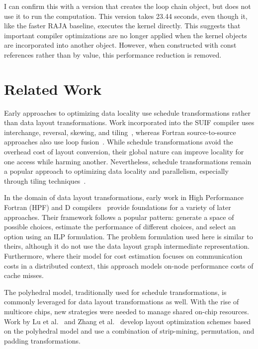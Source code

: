 I can confirm this with a version that creates the loop chain object, but does not use it to run the computation.
This version takes 23.44 seconds, even though it, like the faster RAJA baseline, executes the kernel directly.
This suggests that important compiler optimizations are no longer applied when the kernel objects are incorporated into another object. 
However, when constructed with const references rather than by value, this performance reduction is removed.

\section{Related Work}

Early approaches to optimizing data locality use schedule transformations rather than data layout transformations. 
Work incorporated into the SUIF compiler uses interchange, reversal, skewing, and tiling~\cite{wolf1991data}, whereas Fortran source-to-source approaches also use loop fusion~\cite{mckinley1996improving}.
While schedule transformations avoid the overhead cost of layout conversion, their global nature can improve locality for one access while harming another.
Nevertheless, schedule transformations remain a popular approach to optimizing data locality and parallelism, 
especially through tiling techniques~\cite{bondhugula2008pluto,bertolacci2015parameterized,bondhugula2016diamond,bandishti2012tiling,unat2016tida}.

In the domain of data layout transformations, early work in High Performance Fortran (HPF) and D compilers~\cite{bixby1994automatic,kennedy1995automatic,kennedy1998automatic} provide foundations for a variety of later approaches.
Their framework follows a popular pattern: generate a space of possible choices, estimate the performance of different choices, and select an option using an ILP formulation. 
The problem formulation used here is similar to theirs, although it do not use the data layout graph intermediate representation.
Furthermore, where their model for cost estimation focuses on communication costs in a distributed context, this approach models on-node performance costs of cache misses.

The polyhedral model, traditionally used for schedule transformations, is commonly leveraged for data layout transformations as well.
With the rise of multicore chips, new strategies were needed to manage shared on-chip resources. 
Work by Lu et al.~\cite{lu2009data} and Zhang et al.~\cite{zhang2011optimizing} develop layout optimization schemes based on the polyhedral model and use a combination of strip-mining, permutation, and padding transformations.


